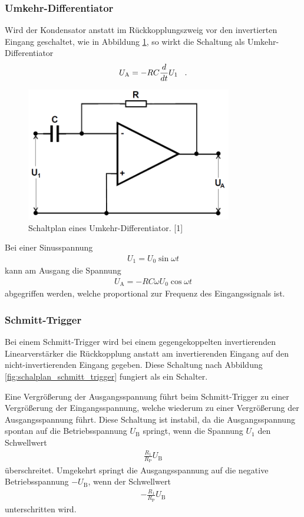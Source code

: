 \documentclass[]{scrartcl}
\begin{document}
\subsubsection{Umkehr-Differentiator}
Wird der Kondensator anstatt im Rückkopplungszweig vor den invertierten Eingang geschaltet, wie in Abbildung \ref{fig:schalplan_umkehrdifferentiator}, so wirkt die Schaltung als Umkehr-Differentiator
\begin{align}
U_\text{A}= -RC \frac{d}{d t} U_1 \hspace{0.3cm}\text{.}
\end{align}
\begin{figure}[H]
\centering
\includegraphics[width=9cm]{images/schaltplan_umkehrdifferentiator.png}
\caption{Schaltplan eines Umkehr-Differentiator. [1]}
\label{fig:schalplan_umkehrdifferentiator}
\end{figure}
Bei einer Sinusspannung
\begin{align}
U_1=U_0 \sin \omega t
\end{align}
kann am Ausgang die Spannung
\begin{align}
U_\text{A} = -RC\omega U_0 \cos \omega t
\end{align}
abgegriffen werden, welche proportional zur Frequenz des Eingangssignals ist.
\subsubsection{Schmitt-Trigger}
Bei einem Schmitt-Trigger wird bei einem gegengekoppelten invertierenden Linearverstärker die Rückkopplung anstatt am invertierenden Eingang auf den nicht-invertierenden Eingang gegeben. Diese Schaltung nach Abbildung \ref{fig:schalplan_schmitt_trigger} fungiert als ein Schalter.

Eine Vergrößerung der Ausgangsspannung führt beim Schmitt-Trigger zu einer Vergrößerung der Eingangsspannung, welche wiederum zu einer Vergrößerung der Ausgangsspannung führt. Diese Schaltung ist instabil, da die Ausgangsspannung spontan auf die Betriebsspannung $U_\text{B}$ springt, wenn die Spannung $U_1$ den Schwellwert
\begin{align}
\frac{R_1}{R_\text{P}}U_\text{B}
\end{align} 
überschreitet. Umgekehrt springt die Ausgangsspannung auf die negative Betriebsspannung $-U_\text{B}$, wenn der Schwellwert
\begin{align}
-\frac{R_1}{R_\text{P}}U_\text{B}
\end{align}
unterschritten wird.
\end{document}
